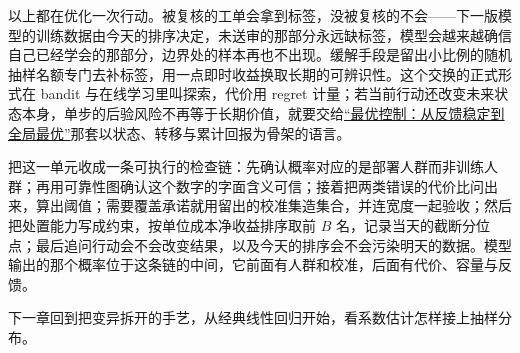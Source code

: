 以上都在优化一次行动。被复核的工单会拿到标签，没被复核的不会——下一版模型的训练数据由今天的排序决定，未送审的那部分永远缺标签，模型会越来越确信自己已经学会的那部分，边界处的样本再也不出现。缓解手段是留出小比例的随机抽样名额专门去补标签，用一点即时收益换取长期的可辨识性。这个交换的正式形式在 bandit 与在线学习里叫探索，代价用 regret 计量；若当前行动还改变未来状态本身，单步的后验风险不再等于长期价值，就要交给\hyperref[ch:138]{``最优控制：从反馈稳定到全局最优''}那套以状态、转移与累计回报为骨架的语言。

把这一单元收成一条可执行的检查链：先确认概率对应的是部署人群而非训练人群；再用可靠性图确认这个数字的字面含义可信；接着把两类错误的代价比问出来，算出阈值；需要覆盖承诺就用留出的校准集造集合，并连宽度一起验收；然后把处置能力写成约束，按单位成本净收益排序取前 \(B\) 名，记录当天的截断分位点；最后追问行动会不会改变结果，以及今天的排序会不会污染明天的数据。模型输出的那个概率位于这条链的中间，它前面有人群和校准，后面有代价、容量与反馈。

下一章回到把变异拆开的手艺，从经典线性回归开始，看系数估计怎样接上抽样分布。
